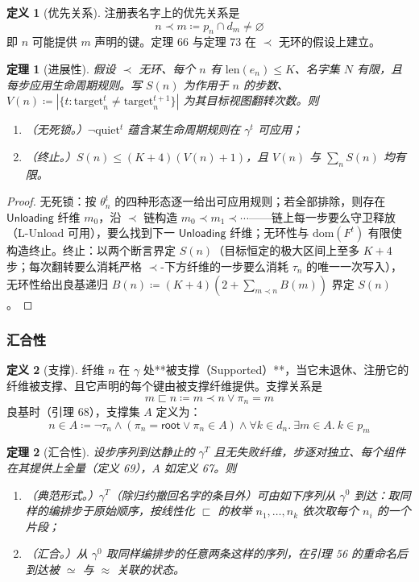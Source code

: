 \documentclass[11pt,a4paper]{article}
\theoremstyle{plain}
\newtheorem{theorem}{定理}
\theoremstyle{definition}
\newtheorem{definition}{定义}
\theoremstyle{remark}
\begin{document}
\begin{definition}[优先关系]
注册表名字上的优先关系是
\[
n \prec m \coloneqq p_n \cap d_m \neq \varnothing \tag{60}
\]
即 $n$ 可能提供 $m$ 声明的键。定理 66 与定理 73 在 $\prec$ 无环的假设上建立。
\end{definition}

\begin{theorem}[进展性]
假设 $\prec$ 无环、每个 $n$ 有 $\mathrm{len}(e_n) \le K$、名字集 $N$ 有限，且每步应用生命周期规则。写 $S(n)$ 为作用于 $n$ 的步数、$V(n) \coloneqq |\{t : \mathrm{target}_n^t \neq \mathrm{target}_n^{t+1}\}|$ 为其目标视图翻转次数。则
\begin{enumerate}
\item（无死锁。）$\neg \mathrm{quiet}^t$ 蕴含某生命周期规则在 $\gamma^t$ 可应用；
\item（终止。）$S(n) \le (K + 4)(V(n) + 1)$，且 $V(n)$ 与 $\sum_n S(n)$ 均有限。
\end{enumerate}
\end{theorem}

\begin{proof}
无死锁：按 $\theta_n^t$ 的四种形态逐一给出可应用规则；若全部排除，则存在 $\mathsf{Unloading}$ 纤维 $m_0$，沿 $\prec$ 链构造 $m_0 \prec m_1 \prec \cdots$——链上每一步要么守卫释放（L-Unload 可用），要么找到下一 $\mathsf{Unloading}$ 纤维；无环性与 $\mathrm{dom}(F^t)$ 有限使构造终止。终止：以两个断言界定 $S(n)$（目标恒定的极大区间上至多 $K+4$ 步；每次翻转要么消耗严格 $\prec$-下方纤维的一步要么消耗 $\tau_n$ 的唯一一次写入），无环性给出良基递归 $B(n) \coloneqq (K+4)(2 + \sum_{m \prec n} B(m))$ 界定 $S(n)$。
\end{proof}

\subsubsection{汇合性}

\begin{definition}[支撑]
纤维 $n$ 在 $\gamma$ 处**被支撑（Supported）**，当它未退休、注册它的纤维被支撑、且它声明的每个键由被支撑纤维提供。支撑关系是
\[
m \sqsubset n \coloneqq m \prec n \vee \pi_n = m \tag{62}
\]
良基时（引理 68），支撑集 $A$ 定义为：
\[
n \in A \coloneqq \neg\tau_n \wedge (\pi_n = \mathsf{root} \vee \pi_n \in A) \wedge \forall k \in d_n.\ \exists m \in A.\ k \in p_m \tag{63}
\]
\end{definition}

\begin{theorem}[汇合性]
设步序列到达静止的 $\gamma^T$ 且无失败纤维，步逐对独立、每个组件在其提供上全量（定义 69），$A$ 如定义 67。则
\begin{enumerate}
\item（典范形式。）$\gamma^T$（除归约撤回名字的条目外）可由如下序列从 $\gamma^0$ 到达：取同样的编排步于原始顺序，按线性化 $\sqsubset$ 的枚举 $n_1, \dots, n_k$ 依次取每个 $n_i$ 的一个片段；
\item（汇合。）从 $\gamma^0$ 取同样编排步的任意两条这样的序列，在引理 56 的重命名后到达被 $\simeq$ 与 $\approx$ 关联的状态。
\end{enumerate}
\end{theorem}
\end{document}
